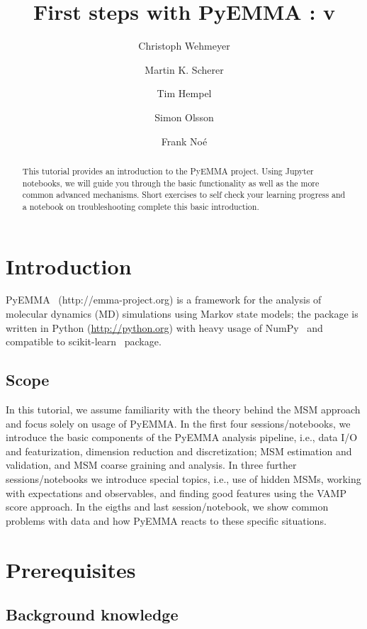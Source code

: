 \documentclass[9pt,tutorial]{livecoms}
\title{First steps with PyEMMA : v\versionnumber}
\author[1\authfn{1}*]{Christoph Wehmeyer}
\author[1\authfn{1}*]{Martin K. Scherer}
\author[1*]{Tim Hempel}
\author[1*]{Simon Olsson}
\author[1*]{Frank Noé}
\affil[1]{Department of Mathematics and Computer Science, Freie Universität Berlin, Arnimallee 6, 14195 Berlin, Germany}
\begin{document}
\begin{frontmatter}
\maketitle

\begin{abstract}
This tutorial provides an introduction to the PyEMMA project. Using Jupyter notebooks, we will guide you through the basic functionality as well as the more common advanced mechanisms. Short exercises to self check your learning progress and a notebook on troubleshooting complete this basic introduction.
\end{abstract}

\end{frontmatter}

\section{Introduction}

PyEMMA~\cite{pyemma} (http://emma-project.org) is a framework for the analysis of molecular dynamics (MD) simulations using Markov state models; the package is written in Python (\url{http://python.org}) with heavy usage of NumPy~\cite{numpy} and compatible to scikit-learn~\cite{sklearn} package.

\subsection{Scope}

In this tutorial, we assume familiarity with the theory behind the MSM approach and focus solely on usage of PyEMMA. In the first four sessions/notebooks, we introduce the basic components of the PyEMMA analysis pipeline, i.e., data I/O and featurization, dimension reduction and discretization; MSM estimation and validation, and MSM coarse graining and analysis. In three further sessions/notebooks we introduce special topics, i.e., use of hidden MSMs, working with expectations and observables, and finding good features using the VAMP score approach. In the eigths and last session/notebook, we show common problems with data and how PyEMMA reacts to these specific situations.

\section{Prerequisites}


\subsection{Background knowledge}
\end{document}
